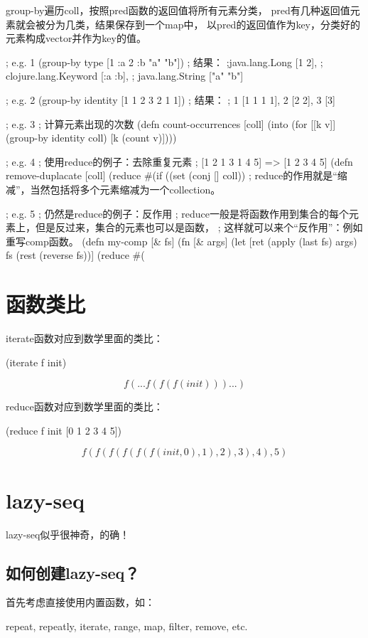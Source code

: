 \documentclass[a4paper,11pt]{article}
\begin{document}
  group-by遍历coll，按照pred函数的返回值将所有元素分类，
  pred有几种返回值元素就会被分为几类，结果保存到一个map中，
  以pred的返回值作为key，分类好的元素构成vector并作为key的值。

  \begin{schemecode}
; e.g. 1
(group-by type [1 :a 2 :b "a" "b"])
; 结果：
;{java.lang.Long [1 2],
; clojure.lang.Keyword [:a :b],
; java.lang.String ["a" "b"]}

; e.g. 2
(group-by identity [1 1 2 3 2 1 1])
; 结果：
; {1 [1 1 1 1], 2 [2 2], 3 [3]}

; e.g. 3
; 计算元素出现的次数
(defn count-occurrences
  [coll]
  (into {}
    (for [[k v]] (group-by identity coll)
      [k (count v)])))

; e.g. 4
; 使用reduce的例子：去除重复元素
; [1 2 1 3 1 4 5] => [1 2 3 4 5]
(defn remove-duplacate
  [coll]
  (reduce #(if ((set %
               (conj %
          [] coll))
; reduce的作用就是“缩减”，当然包括将多个元素缩减为一个collection。

; e.g. 5
; 仍然是reduce的例子：反作用
; reduce一般是将函数作用到集合的每个元素上，但是反过来，集合的元素也可以是函数，
; 这样就可以来个“反作用”：例如重写comp函数。
(defn my-comp
  [& fs]
  (fn [& args]
    (let [ret (apply (last fs) args)
          fs (rest (reverse fs))]
      (reduce #(%
  \end{schemecode}
  

  \section[函数类比]{函数类比}
  iterate函数对应到数学里面的类比：
  
  \begin{schemecode}
(iterate f init)
  \end{schemecode}
  $$f(...f(f(f(init)))...)$$

  reduce函数对应到数学里面的类比：
  
  \begin{schemecode}
(reduce f init [0 1 2 3 4 5])
  \end{schemecode}
  $$f(f(f(f(f(f(init, 0), 1), 2), 3), 4), 5)$$


  \section[lazy-seq]{lazy-seq}
  lazy-seq似乎很神奇，的确！

  \subsection[如何创建lazy-seq？]{如何创建lazy-seq？}
  首先考虑直接使用内置函数，如：\par
  repeat, repeatly, iterate, range, map, filter, remove, etc.
  
\end{document}
